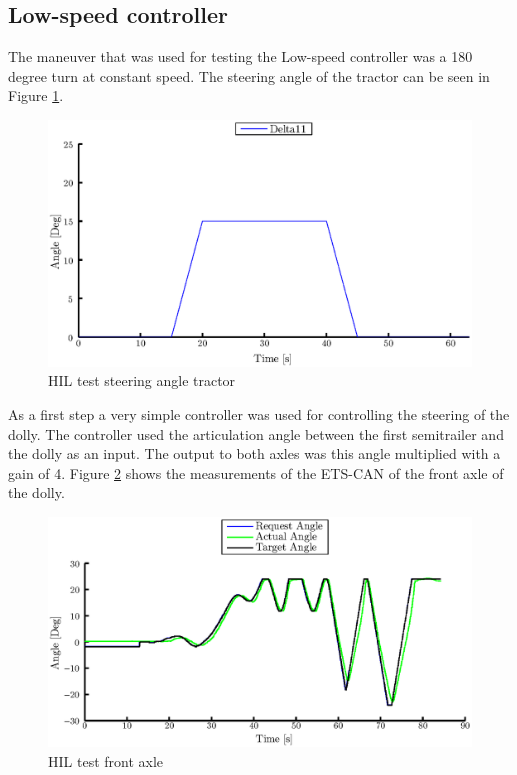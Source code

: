 \documentclass[ExampleMasters.tex]{subfiles}
\begin{document}
\subsection{Low-speed controller}
The maneuver that was used for testing the Low-speed controller was a 180 degree turn at constant speed. The steering angle of the tractor can be seen in Figure \ref{fig:HIL002_delta11}.\\
\begin{figure}[h]
	\centering
	\includegraphics[width=1\linewidth]{figures/HIL_delta11}
	\caption{HIL test steering angle tractor}
	
	\label{fig:HIL002_delta11}
\end{figure}
As a first step a very simple controller was used for controlling the steering of the dolly. The controller used the articulation angle between the first semitrailer and the dolly as an input. The output to both axles was this angle multiplied with a gain of 4.
Figure \ref{fig:HIL002_front} shows the measurements of the \gls{ETS}-\gls{CAN} of the front axle of the dolly.\\

\begin{figure}[h]
	\centering
	\includegraphics[width=1\linewidth]{figures/HIL002_front}
	\caption{HIL test front axle}
	
	\label{fig:HIL002_front}
\end{figure}
\end{document}

